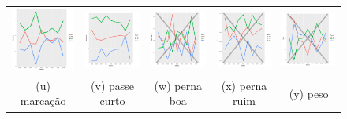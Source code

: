 \documentclass[review]{elsarticle}
\begin{document}
\begin{figure}
\begin{tabular}{ccccc}
   \includegraphics[width=25mm]{marcacao_result} & \includegraphics[width=25mm]{passecurto_result}   &   \includegraphics[width=25mm]{pernaboa_result}&
  \includegraphics[width=25mm]{pernaruim_result}   & \includegraphics[width=25mm]{peso_result}   \\
 \scriptsize{(u) marcação} & \scriptsize{(v) passe curto } & \scriptsize{(w) perna boa} & \scriptsize{(x) perna ruim} & \scriptsize{(y) peso}\\[3pt]
 

\end{tabular}
\end{figure}
\end{document}
